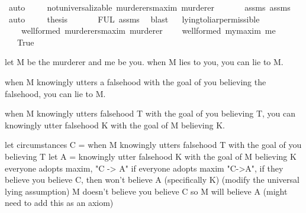 \begin{isabellebody}
\ auto\isanewline
\ \ \ \isamarkupfalse%
\ {\isachardoublequoteopen}not{\isacharunderscore}universalizable\ murderers{\isacharunderscore}maxim\ murderer{\isachardoublequoteclose}\isanewline
\ \ \ \ \ \isamarkupfalse%
\ assms{\isacharparenleft}{}{\isacharparenright}\ assms{\isacharparenleft}{}{\isacharparenright}\ \isamarkupfalse%
\ auto\isanewline
\ \ \ \isamarkupfalse%
\ {\isacharquery}thesis\isanewline
\ \ \ \ \ \isamarkupfalse%
\ FUL\ assms{\isacharparenleft}{}{\isacharparenright}\ \isamarkupfalse%
\ blast\isanewline
\ \isamarkupfalse%
%
\endisatagproof
{\isafoldproof}%
%
\isadelimproof
\isanewline
%
\endisadelimproof
\isanewline
\isanewline
{}\isamarkupfalse%
\ lying{\isacharunderscore}to{\isacharunderscore}liar{\isacharunderscore}permissible{\isacharcolon}\isanewline
\ \ \ {\isachardoublequoteopen}{\isasymTurnstile}\ {\isacharparenleft}well{\isacharunderscore}formed\ murderers{\isacharunderscore}maxim\ murderer{\isacharparenright}{\isachardoublequoteclose}\isanewline
\ \ \ {\isachardoublequoteopen}{\isasymTurnstile}\ {\isacharparenleft}well{\isacharunderscore}formed\ my{\isacharunderscore}maxim\ me{\isacharparenright}{\isachardoublequoteclose}\isanewline
\ \ \ True%
\isadelimproof
\ %
\endisadelimproof
%
\isatagproof
{}\isamarkupfalse%
%
\endisatagproof
{\isafoldproof}%
%
\isadelimproof
%
\endisadelimproof
%
\begin{isamarkuptext}%
let M be the murderer and me be you.
when M lies to you, you can lie to M. 

when M knowingly utters a falsehood with the goal of you believing the falsehood, you can lie to M.

when M knowingly utters falsehood T with the goal of you believing T, you can knowingly
utter falsehood K with the goal of M believing K.

let circumstances C = when M knowingly utters falsehood T with the goal of you believing T
let A = knowingly utter falsehood K with the goal of M believing K
everyone adopts maxim, "C -> A" 
if everyone adopts maxim "C->A", if they believe you believe C, then won't believe A (specifically K) (modify the universal lying assumption)
M doesn't believe you believe C
so M will believe A (might need to add this as an axiom)%
\end{isamarkuptext}\isamarkuptrue%
%
\isadelimdocument
%
\endisadelimdocument
%
\isatagdocument
%
\endisatagdocument
{\isafolddocument}%
%
\isadelimdocument
%
\endisadelimdocument
%
\isadelimtheory
%
\endisadelimtheory
%
\isatagtheory
%
\endisatagtheory
{\isafoldtheory}%
%
\isadelimtheory
%
\endisadelimtheory
%
\end{isabellebody}%
